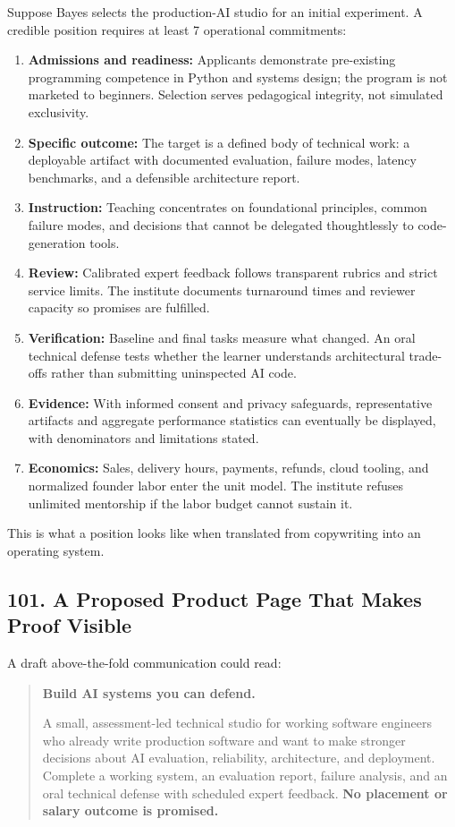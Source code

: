 Suppose Bayes selects the production-AI studio for an initial experiment. A credible position requires at least 7 operational commitments:

\begin{enumerate}
    \item \textbf{Admissions and readiness:} Applicants demonstrate pre-existing programming competence in Python and systems design; the program is not marketed to beginners. Selection serves pedagogical integrity, not simulated exclusivity.
    \item \textbf{Specific outcome:} The target is a defined body of technical work: a deployable artifact with documented evaluation, failure modes, latency benchmarks, and a defensible architecture report.
    \item \textbf{Instruction:} Teaching concentrates on foundational principles, common failure modes, and decisions that cannot be delegated thoughtlessly to code-generation tools.
    \item \textbf{Review:} Calibrated expert feedback follows transparent rubrics and strict service limits. The institute documents turnaround times and reviewer capacity so promises are fulfilled.
    \item \textbf{Verification:} Baseline and final tasks measure what changed. An oral technical defense tests whether the learner understands architectural trade-offs rather than submitting uninspected AI code.
    \item \textbf{Evidence:} With informed consent and privacy safeguards, representative artifacts and aggregate performance statistics can eventually be displayed, with denominators and limitations stated.
    \item \textbf{Economics:} Sales, delivery hours, payments, refunds, cloud tooling, and normalized founder labor enter the unit model. The institute refuses unlimited mentorship if the labor budget cannot sustain it.
\end{enumerate}

This is what a position looks like when translated from copywriting into an operating system.

\subsection*{101. A Proposed Product Page That Makes Proof Visible}

A draft above-the-fold communication could read:

\begin{quote}
\textbf{Build AI systems you can defend.}

A small, assessment-led technical studio for working software engineers who already write production software and want to make stronger decisions about AI evaluation, reliability, architecture, and deployment. Complete a working system, an evaluation report, failure analysis, and an oral technical defense with scheduled expert feedback. \textbf{No placement or salary outcome is promised.}
\end{quote}


